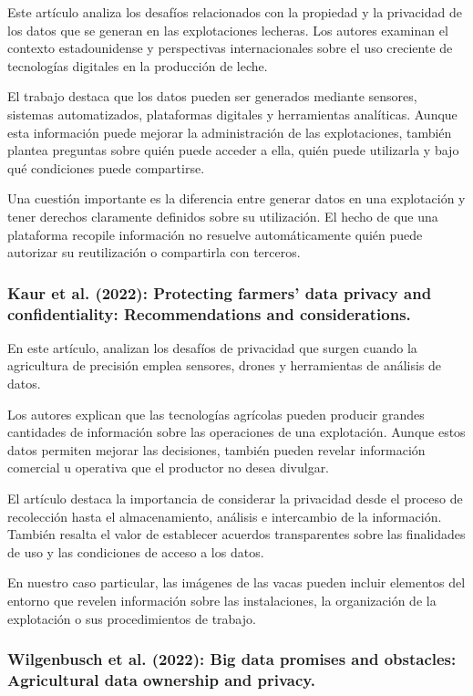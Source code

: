 Este artículo analiza los desafíos relacionados con la propiedad y la privacidad de los datos que se generan en las explotaciones lecheras. Los autores examinan el contexto estadounidense y perspectivas internacionales sobre el uso creciente de tecnologías digitales en la producción de leche.

El trabajo destaca que los datos pueden ser generados mediante sensores, sistemas automatizados, plataformas digitales y herramientas analíticas. Aunque esta información puede mejorar la administración de las explotaciones, también plantea preguntas sobre quién puede acceder a ella, quién puede utilizarla y bajo qué condiciones puede compartirse.

Una cuestión importante es la diferencia entre generar datos en una explotación y tener derechos claramente definidos sobre su utilización. El hecho de que una plataforma recopile información no resuelve automáticamente quién puede autorizar su reutilización o compartirla con terceros.

\subsubsection{Kaur et al. (2022): Protecting farmers' data privacy and confidentiality: Recommendations and considerations.}

En este artículo, analizan los desafíos de privacidad que surgen cuando la agricultura de precisión emplea sensores, drones y herramientas de análisis de datos.

Los autores explican que las tecnologías agrícolas pueden producir grandes cantidades de información sobre las operaciones de una explotación. Aunque estos datos permiten mejorar las decisiones, también pueden revelar información comercial u operativa que el productor no desea divulgar.

El artículo destaca la importancia de considerar la privacidad desde el proceso de recolección hasta el almacenamiento, análisis e intercambio de la información. También resalta el valor de establecer acuerdos transparentes sobre las finalidades de uso y las condiciones de acceso a los datos.

En nuestro caso particular, las imágenes de las vacas pueden incluir elementos del entorno que revelen información sobre las instalaciones, la organización de la explotación o sus procedimientos de trabajo.

\subsubsection{Wilgenbusch et al. (2022): Big data promises and obstacles: Agricultural data ownership and privacy.}

